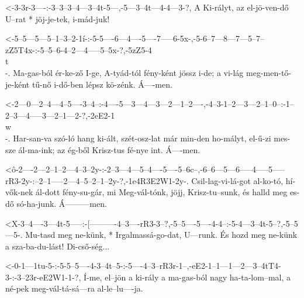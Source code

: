 


  {<-3-3r-3----:-3--3--3--4---3--4t-5---,-5---3--4t---4-4---3-?,}
  {  A Ki-rályt, az el-jö-ven-dő U--rat * jöj-je-tek, i-mád-juk!}


  {<-5--5---5---5--1--3--2-1í-:-5-5----6---4----5----7-----6-5x-,-5-6--7---8---7---5--7--zZ5T4x-:-5--5--6-4--2---4-----5--5x-?,-5zZ5-4\\t\\-.}
  {  Ma-gas-ból ér-ke-ző I-ge,  A-tyád-tól fény-ként jössz i-de;  a vi-lág meg-men-tő-je-ként     tű-nő i-dő-ben lépsz kö-zénk. Á----men.}


  {<-2---0---2--4---4--5----3--4--:-4----5---3---4---3---2---1--2----,-4--3-1--2---3---2--1--0--:-1--2--3---4-----3---2--1---2-?,-2eE2-1\\w\\-.}
  {  Har-san-va szó-ló hang ki-ált, szét-osz-lat már min-den ho-mályt, el-ű-zi mes-sze ál-ma-ink; az ég-ből Krisz-tus fé-nye int. Á----men.}


  {<ô-2----2---2--1--2---4--3--2y-:-2--3---4---5--4----5----5--6c--,-6--6---5---6-----4-----5-----rR3-2y-:--2--1-----2---4--5--2--1--2y-?,-1e4R3E2W1-2y-.}
  {   Csil-lag-vi-lá-got al-ko-tó,  hí-vők-nek ál-dott fény-su-gár,  mi Meg-vál-tónk, jöjj, Krisz-tu--sunk, és halld meg es-dő só-ha-junk. Á---------men.}



  {<X-3--4----3---4t-5-----:-[----------4--3----rR3-3--?,-5--5----5----4-4--:-5-4---3--4t-5--?,-5--5---5-.}
  {   Mu-tasd meg ne-künk, * Irgalmassá-go-dat, U---runk. És hozd meg ne-künk a sza-ba-du-lást! Di-cső-ség...}


  {<-0-1---1tu-5-:-5-5--5----4-3--4t--5-:-5----4--3--rR3r-1--,-eE2-1--1---1---2---3--4tT4-3-:-3--23r-eE2W1-1-?,}
  {  Í-me, el--jön a ki-rály a ma-gas-ból nagy ha-ta-lom--mal, a   né-pek meg-vál-tá-sá---ra  al-le--lu----ja.}

